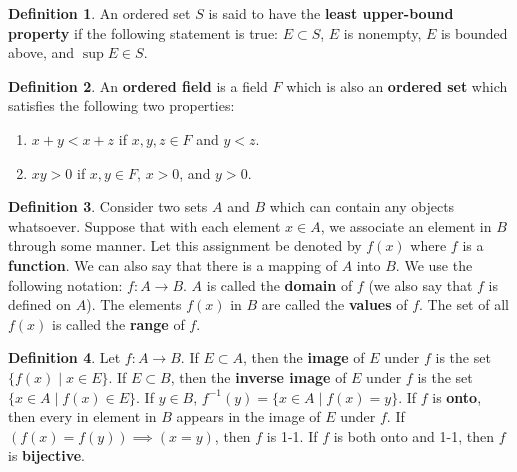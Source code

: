 \documentclass[12pt]{article}
\theoremstyle{definition}
\newtheorem{definition}{Definition}
\theoremstyle{named}
\newcounter{customDef}
\begin{document}
\setcounter{customDef}{0}
\renewcommand{\thedefinition}{1.10}
\begin{definition}
    An ordered set $S$ is said to have the \textbf{least upper-bound property} if the following statement is true: $E \subset S$, $E$ is nonempty, $E$ is bounded above, and $\sup E \in S$. 
\end{definition}

\setcounter{customDef}{0}
\renewcommand{\thedefinition}{1.17}
\begin{definition}
    An \textbf{ordered field} is a field $F$ which is also an \textbf{ordered set} which satisfies the following two properties:
    \begin{enumerate}
        \item $x+y<x+z$ if $x,y,z \in F$ and $y<z$.
        \item $xy>0$ if $x,y \in F$, $x>0$, and $y>0$. 
    \end{enumerate}
\end{definition}

\setcounter{customDef}{0}
\renewcommand{\thedefinition}{2.1}
\begin{definition}
    Consider two sets $A$ and $B$ which can contain any objects whatsoever. Suppose that with each element $x \in A$, we associate an element in $B$ through some manner. Let this assignment be denoted by $f(x)$ where $f$ is a \textbf{function}. We can also say that there is a mapping of $A$ into $B$. We use the following notation: $f: A \to B$. $A$ is called the \textbf{domain} of $f$ (we also say that $f$ is defined on $A$). The elements $f(x)$ in $B$ are called the \textbf{values} of $f$. The set of all $f(x)$ is called the \textbf{range} of $f$. 
\end{definition}

\setcounter{customDef}{0}
\renewcommand{\thedefinition}{2.2}
\begin{definition}
    Let $f: A \to B$. If $E \subset A$, then the \textbf{image} of $E$ under $f$ is the set $\{f(x) \mid x \in E\}$. If $E \subset B$, then the \textbf{inverse image} of $E$ under $f$ is the set $\{x \in A \mid f(x) \in E\}$. If $y \in B$, $f^{-1}(y) = \{x \in A \mid f(x)=y\}$. If $f$ is \textbf{onto}, then every in element in $B$ appears in the image of $E$ under $f$. If $(f(x) = f(y))\implies(x=y)$, then $f$ is 1-1. If $f$ is both onto and 1-1, then $f$ is \textbf{bijective}. 
\end{definition}
\end{document}
